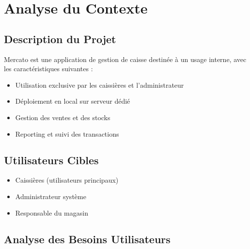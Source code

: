 \documentclass[14pt,a4paper]{report}
\begin{document}
\tableofcontents
\newpage

\chapter{Analyse du Contexte}

\section{Description du Projet}
Mercato est une application de gestion de caisse destinée à un usage interne, avec les caractéristiques suivantes :
\begin{itemize}
    \item Utilisation exclusive par les caissières et l'administrateur
    \item Déploiement en local sur serveur dédié
    \item Gestion des ventes et des stocks
    \item Reporting et suivi des transactions
\end{itemize}

\section{Utilisateurs Cibles}
\begin{itemize}
    \item Caissières (utilisateurs principaux)
    \item Administrateur système
    \item Responsable du magasin
\end{itemize}

\section{Analyse des Besoins Utilisateurs}
\end{document}
